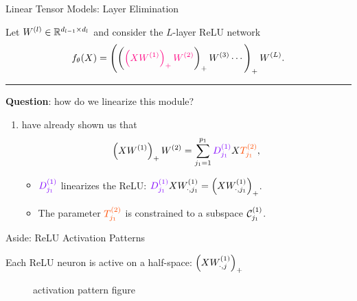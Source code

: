 \documentclass[usenames,dvipsnames,notheorems]{beamer}
\newcommand{\horizontalrule}{
	{
			\vspace{-0.5em}
			\center \rule{\textwidth}{0.1em}
			\vspace{-0.2em}
		}
}
\def\showtikz{}
\begin{document}
\begin{frame}{Linear Tensor Models: Layer Elimination}

	Let \( W^{(l)} \in \mathbb{R}^{d_{l-1} \times d_l} \) and
	consider the \( L \)-layer ReLU network
	\[
		f_\theta(X) =
		\rbr{\rbr{\textcolor{brightpink}{\rbr{X W^{(1)}}_+ W^{(2)}}}_+ W^{(3)} \cdots }_+ W^{(L)}.
	\]

	\pause
	\horizontalrule

	\textbf{Question}: how do we linearize this module?

	\pause
	\vspace{1ex}

	\begin{enumerate}
		\item \citet{pilanci2020convex} have already shown us that
		      \[
			      \rbr{X W^{(1)}}_+ W^{(2)}
			      = \sum_{j_1 = 1}^{p_1} \textcolor{violet}{D^{(1)}_{j_1}} X \textcolor{mikadoyellow}{T^{(2)}_{j_1}},
		      \]
		      \pause
		      \begin{itemize}
			      \item \( \textcolor{violet}{D_{j_1}^{(1)}} \) linearizes the ReLU:
			            \( \textcolor{violet}{D_{j_1}^{(1)}} X W^{(1)}_{\cdot, j_1} = \rbr{X W^{(1)}_{\cdot, j_1}}_+ \).
			            \pause
			            \vspace{0.5ex}
			      \item The parameter \( \textcolor{mikadoyellow}{T^{(2)}_{j_1}} \) is constrained
			            to a subspace \( \mathcal{C}^{(1)}_{j_1} \).
		      \end{itemize}
	\end{enumerate}
\end{frame}

\begin{frame}{Aside: ReLU Activation Patterns}

	Each ReLU neuron is active on a half-space: \( \left(X W^{(1)}_{\cdot, j}\right)_+ \)

	\pause

	\begin{figure}[]
		\centering
		\ifdefined\showtikz
			
		\else
			\Huge activation pattern figure
		\fi
	\end{figure}


\end{frame}
\end{document}
